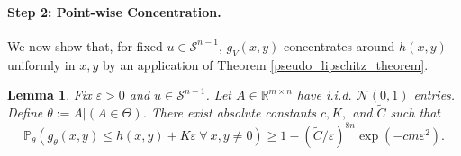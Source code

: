 \documentclass[11pt]{article}
\newcommand{\R}{\mathbb{R}}
\newcommand{\N}{\mathcal{N}}
\newcommand{\Pro}{\mathbb{P}}
\newcommand{\Scal}{\mathcal{S}}
\renewcommand{\epsilon}{\varepsilon}
\newtheorem{lemma}{Lemma}
\begin{document}
\paragraph{\textbf{Step 2: Point-wise Concentration.}} We now show that, for fixed $u \in \Scal^{n-1}$, $g_V(x,y)$ concentrates around $h(x,y)$ uniformly in $x,y$ by an application of Theorem \ref{pseudo_lipschitz_theorem}. 

\begin{lemma}\label{pointwise_conc_gM} Fix $\epsilon > 0$ and $u \in \Scal^{n-1}$. Let $A \in \R^{m \times n}$ have i.i.d. $\N(0,1)$ entries. Define $\theta := A|(A \in \Theta)$. There exist absolute constants $c, K,$ and $\tilde{C}$ such that $$\Pro_{\theta}\left(g_{\theta}(x,y) \leqslant h(x,y) + K\epsilon \ \forall\ x,y \neq 0\right) \geqslant 1 - (\tilde{C}/\epsilon)^{8n}\exp(-cm\epsilon^2).$$
\end{lemma}
\end{document}
